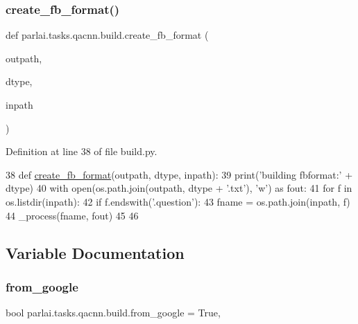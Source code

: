 \subsubsection{\texorpdfstring{create\+\_\+fb\+\_\+format()}{create\_fb\_format()}}
{\footnotesize\ttfamily def parlai.\+tasks.\+qacnn.\+build.\+create\+\_\+fb\+\_\+format (\begin{DoxyParamCaption}\item[{}]{outpath,  }\item[{}]{dtype,  }\item[{}]{inpath }\end{DoxyParamCaption})}



Definition at line 38 of file build.\+py.


\begin{DoxyCode}
38 \textcolor{keyword}{def }\hyperlink{namespaceparlai_1_1tasks_1_1wikiqa_1_1build_a554828702769592403db58c955d1dfe3}{create\_fb\_format}(outpath, dtype, inpath):
39     print(\textcolor{stringliteral}{'building fbformat:'} + dtype)
40     with open(os.path.join(outpath, dtype + \textcolor{stringliteral}{'.txt'}), \textcolor{stringliteral}{'w'}) \textcolor{keyword}{as} fout:
41         \textcolor{keywordflow}{for} f \textcolor{keywordflow}{in} os.listdir(inpath):
42             \textcolor{keywordflow}{if} f.endswith(\textcolor{stringliteral}{'.question'}):
43                 fname = os.path.join(inpath, f)
44                 \_process(fname, fout)
45 
46 
\end{DoxyCode}


\subsection{Variable Documentation}
\mbox{\label{namespaceparlai_1_1tasks_1_1qacnn_1_1build_a64eee1d9bbe5faac5b152bae72cb8d92}} 
\subsubsection{\texorpdfstring{from\+\_\+google}{from\_google}}
{\footnotesize\ttfamily bool parlai.\+tasks.\+qacnn.\+build.\+from\+\_\+google = True,}



